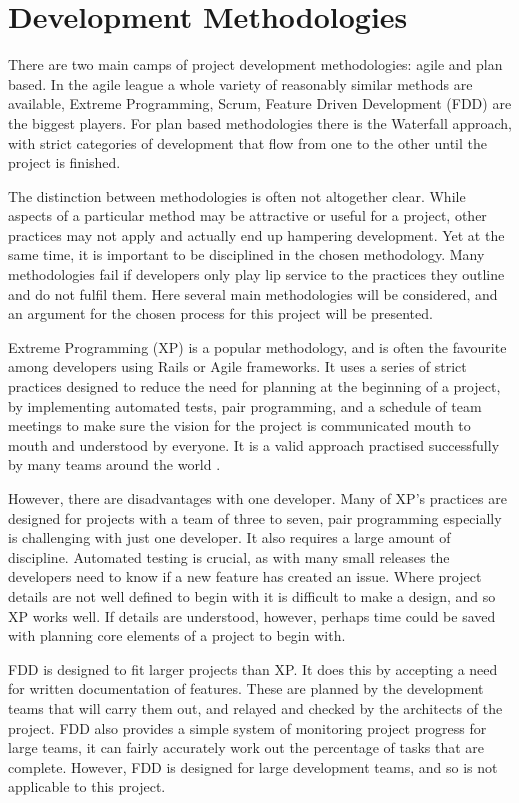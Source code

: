 \section{Development Methodologies}
There are two main camps of project development methodologies: agile and plan based. In the agile league a whole variety of reasonably similar methods are available, Extreme Programming, Scrum, Feature Driven Development (FDD) are the biggest players. For plan based methodologies there is the Waterfall approach, with strict categories of development that flow from one to the other until the project is finished.
	
The distinction between methodologies is often not altogether clear. While aspects of a particular method may be attractive or useful for a project, other practices may not apply and actually end up hampering development. Yet at the same time, it is important to be disciplined in the chosen methodology. Many methodologies fail if developers only play lip service to the practices they outline and do not fulfil them. Here several main methodologies will be considered, and an argument for the chosen process for this project will be presented.
	
Extreme Programming (XP) is a popular methodology, and is often the favourite among developers using Rails or Agile frameworks. It uses a series of strict practices designed to reduce the need for planning at the beginning of a project, by implementing automated tests, pair programming, and a schedule of team meetings to make sure the vision for the project is communicated mouth to mouth and understood by everyone. It is a valid approach practised successfully by many teams around the world \cite{XP}.
	
However, there are disadvantages with one developer. Many of XP's practices are designed for projects with a team of three to seven, pair programming especially is challenging with just one developer. It also requires a large amount of discipline. Automated testing is crucial, as with many small releases the developers need to know if a new feature has created an issue. Where project details are not well defined to begin with it is difficult to make a design, and so XP works well. If details are understood, however, perhaps time could be saved with planning core elements of a project to begin with.
	
FDD is designed to fit larger projects than XP. It does this by accepting a need for written documentation of features. These are planned by the development teams that will carry them out, and relayed and checked by the architects of the project. FDD also provides a simple system of monitoring project progress for large teams, it can fairly accurately work out the percentage of tasks that are complete. However, FDD is designed for large development teams, and so is not applicable to this project.
	
